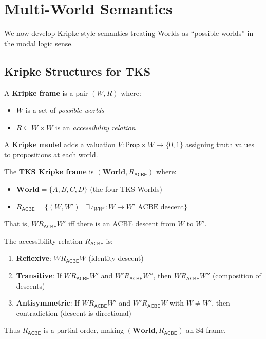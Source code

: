 \section{Multi-World Semantics}
\label{sec:multi-world-semantics}

We now develop Kripke-style semantics treating Worlds as ``possible worlds''
in the modal logic sense.

\subsection{Kripke Structures for TKS}
\label{subsec:kripke-structures}

\begin{definition}
\label{def:kripke-frame}
A \textbf{Kripke frame} is a pair $(W, R)$ where:
\begin{itemize}
  \item $W$ is a set of \emph{possible worlds}
  \item $R \subseteq W \times W$ is an \emph{accessibility relation}
\end{itemize}
A \textbf{Kripke model} adds a valuation $V : \mathsf{Prop} \times W \to \{0, 1\}$
assigning truth values to propositions at each world.
\end{definition}

\begin{definition}
\label{def:tks-kripke-frame}
The \textbf{TKS Kripke frame} is $(\mathbf{World}, R_{\mathsf{ACBE}})$ where:
\begin{itemize}
  \item $\mathbf{World} = \{A, B, C, D\}$ (the four TKS Worlds)
  \item $R_{\mathsf{ACBE}} = \{(W, W') \mid \exists\, \iota_{WW'} : W \to W' \text{ ACBE descent}\}$
\end{itemize}
That is, $W \mathrel{R_{\mathsf{ACBE}}} W'$ iff there is an ACBE descent from $W$ to $W'$.
\end{definition}

\begin{proposition}
\label{prop:acbe-accessibility}
The accessibility relation $R_{\mathsf{ACBE}}$ is:
\begin{enumerate}
  \item \textbf{Reflexive}: $W \mathrel{R_{\mathsf{ACBE}}} W$ (identity descent)
  \item \textbf{Transitive}: If $W \mathrel{R_{\mathsf{ACBE}}} W'$ and
        $W' \mathrel{R_{\mathsf{ACBE}}} W''$, then $W \mathrel{R_{\mathsf{ACBE}}} W''$
        (composition of descents)
  \item \textbf{Antisymmetric}: If $W \mathrel{R_{\mathsf{ACBE}}} W'$ and
        $W' \mathrel{R_{\mathsf{ACBE}}} W$ with $W \neq W'$, then contradiction
        (descent is directional)
\end{enumerate}
Thus $R_{\mathsf{ACBE}}$ is a partial order, making $(\mathbf{World}, R_{\mathsf{ACBE}})$
an S4 frame.
\end{proposition}

